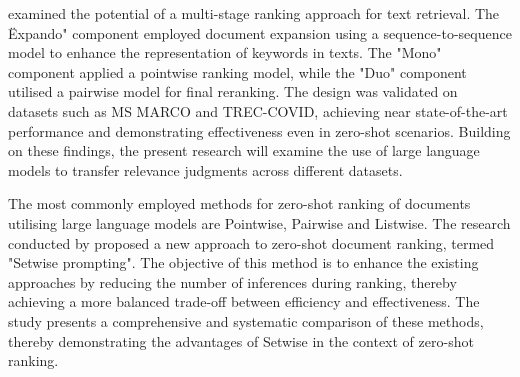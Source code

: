 \citet{pradeep:2021} examined the potential of a multi-stage ranking approach for text retrieval. The \"Expando" component employed document expansion using a sequence-to-sequence model to enhance the representation of keywords in texts. The "Mono" component applied a pointwise ranking model, while the "Duo" component utilised a pairwise model for final reranking. The design was validated on datasets such as MS MARCO and TREC-COVID, achieving near state-of-the-art performance and demonstrating effectiveness even in zero-shot scenarios. Building on these findings, the present research will examine the use of large language models to transfer relevance judgments across different datasets.

The most commonly employed methods for zero-shot ranking of documents utilising large language models are Pointwise, Pairwise and Listwise. The research conducted by \citet{zhuang:2024} proposed a new approach to zero-shot document ranking, termed "Setwise prompting". The objective of this method is to enhance the existing approaches by reducing the number of inferences during ranking, thereby achieving a more balanced trade-off between efficiency and effectiveness. The study presents a comprehensive and systematic comparison of these methods, thereby demonstrating the advantages of Setwise in the context of zero-shot ranking.